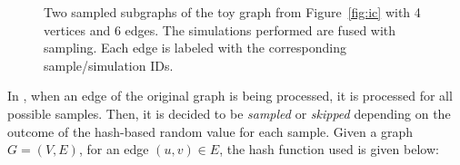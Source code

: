 \documentclass[final,5p,times,twocolumn]{elsarticle}
\newcommand\acro{{\sc{HyperFuseR\xspace}\xspace}\xspace}
\begin{document}
\begin{figure}[!ht] 
    \centering
  \caption{\small{
  \protect{} Two sampled subgraphs of the toy graph from Figure~\ref{fig:ic} with 4 vertices and 6 edges.
  \protect{} The simulations performed are fused with sampling. Each edge is labeled with the corresponding sample/simulation IDs. 
  }}
  \label{fig:traversal} 
\end{figure}

In \acro, when an edge of the original graph is being processed, it is processed for all possible samples. Then, it is decided to be {\it sampled} or {\it skipped} depending on the outcome of the hash-based random value for each sample. Given a graph $G = (V, E)$, for an edge $(u, v) \in E$, the hash function used is given below:
\end{document}
